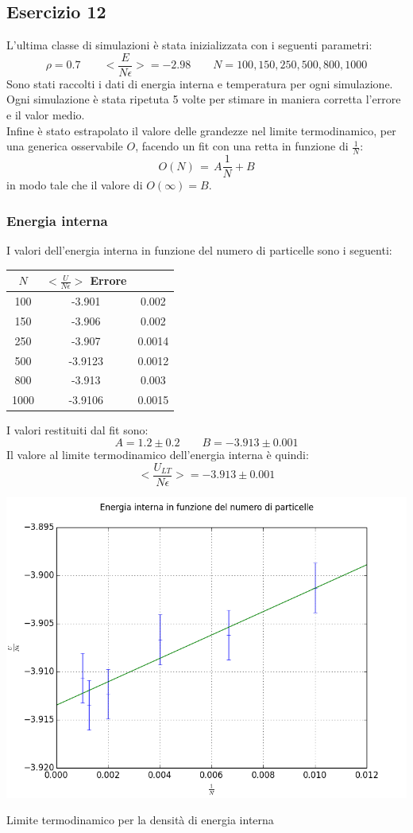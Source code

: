 \subsection{Esercizio 12}
L'ultima classe di simulazioni è stata inizializzata con i seguenti parametri:
$$
 \rho = 0.7 \qquad <\frac{E}{N \epsilon}> = -2.98 \qquad N = 100,150,250,500,800,1000
$$
Sono stati raccolti i dati di energia interna e temperatura per ogni simulazione. Ogni simulazione è stata ripetuta 5 volte per stimare in maniera corretta l'errore e il valor medio.\\
Infine è stato estrapolato il valore delle grandezze nel limite termodinamico, per una generica osservabile $O$, facendo un fit con una retta in funzione di $\frac{1}{N}$:
$$
	O(N) \, = \,A \frac{1}{N} + B
$$
in modo tale che il valore di $O(\infty) = B$.
\subsubsection{Energia interna}
I valori dell'energia interna in funzione del numero di particelle sono i seguenti:
\begin{center}
	\begin{tabular}{c c c }
		\toprule	
		$N$ & $ <\frac{U}{N \epsilon}>  $ Errore \\
		\midrule
100 &  -3.901 & 0.002 \\ 
150 &  -3.906 & 0.002 \\ 
250 &  -3.907 & 0.0014 \\ 
 500 &  -3.9123 & 0.0012 \\ 
 800 &  -3.913 & 0.003 \\ 
 1000 &  -3.9106 & 0.0015 \\ 
 
	\end{tabular}
\end{center}


I valori restituiti dal fit sono:
$$
	A =  1.2\pm 0.2 \qquad B = -3.913 \pm 0.001
$$
Il valore al limite termodinamico dell'energia interna è quindi:
$$
	<\frac{U_{LT}}{N \epsilon}> = -3.913 \pm 0.001
$$
\begin{myfig}[ht]
\includegraphics[scale=0.5]{soft_core/12lt.png}
\caption{Limite termodinamico per la densità di energia interna}
\end{myfig}


